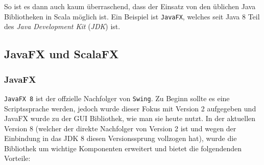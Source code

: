 So ist es dann auch kaum überraschend, dass der Einsatz von den üblichen Java Bibliotheken in Scala möglich ist. Ein Beispiel ist \texttt{JavaFX}, welches seit Java 8 Teil des \textit{Java Development Kit} (\textit{JDK}) ist.

\subsection{JavaFX und ScalaFX}
\subsubsection{JavaFX}
\texttt{JavaFX 8} ist der offzielle Nachfolger von \texttt{Swing}. Zu Beginn sollte es eine Scriptssprache werden, jedoch wurde dieser Fokus mit Version 2 aufgegeben und JavaFX wurde zu der GUI Bibliothek, wie man sie heute nutzt. In der aktuellen Version 8 (welcher der direkte Nachfolger von Version 2 ist und wegen der Einbindung in das JDK 8 diesen Versionssprung vollzogen hat), wurde die Bibliothek um wichtige Komponenten erweitert und bietet die folgendenden Vorteile:

